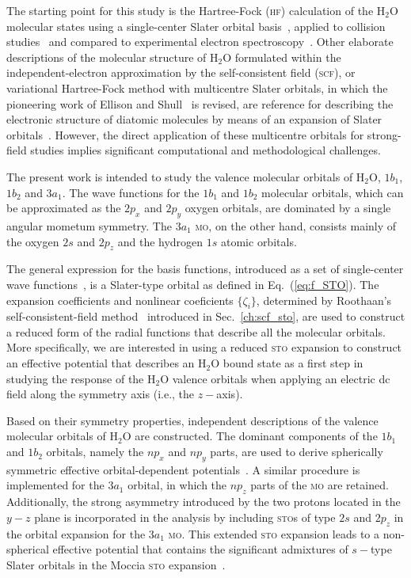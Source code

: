The starting point for this study is the Hartree-Fock (\textsc{hf})
calculation of the H$_{2}$O molecular states using a single-center
Slater orbital
basis~\cite{Moccia_1964,Moccia_JCP_2164,Moccia_JCP_2176}, applied to
collision studies~\cite{Montanari_2013} and compared to experimental
electron spectroscopy~\cite{Hafied_2007}. Other elaborate descriptions
of the molecular structure of H$_{2}$O formulated within the
independent-electron approximation by the self-consistent field
(\textsc{scf}), or variational Hartree-Fock method with multicentre
Slater orbitals, in which the pioneering work of Ellison and
Shull~\cite{EllisonShullh2o_1955} is revised, are reference for
describing the electronic structure of diatomic molecules by means of
an expansion of Slater
orbitals~\cite{Pitzer_1968,Pitzer_1970}. However, the direct
application of these multicentre orbitals for strong-field studies
implies significant computational and methodological challenges.

The present work is intended to study the valence molecular orbitals
of H$_{2}$O, $1b_{1}$, $1b_{2}$ and $3a_{1}$. The wave functions for
the $1b_{1}$ and $1b_{2}$ molecular orbitals, which can be
approximated as the $2p_{x}$ and $2p_{y}$ oxygen orbitals, are
dominated by a single angular mometum symmetry. The $3a_{1}$
\textsc{mo}, on the other hand, consists mainly of the oxygen $2s$ and
$2p_{z}$ and the hydrogen $1s$ atomic orbitals.

The general expression for the basis functions, introduced as a set of
single-center wave
functions~\cite{Moccia_1964,Moccia_JCP_2164,Moccia_JCP_2176}, is a
Slater-type orbital as defined in Eq.~(\ref{eq:f_STO}). The expansion
coefficients and nonlinear coeficients $\{\zeta_{i}\}$, determined by
Roothaan's self-consistent-field
method~\cite{Moccia_1964,Roothaan_1951} introduced in
Sec.~\ref{ch:scf_sto}, are used to construct a reduced form of the
radial functions that describe all the molecular orbitals. More
specifically, we are interested in using a reduced \textsc{sto}
expansion to construct an effective potential that describes an
H$_{2}$O bound state as a first step in studying the response of the
H$_{2}$O valence orbitals when applying an electric dc field along the
symmetry axis (i.e., the $z-$axis).

Based on their symmetry properties, independent descriptions of the
valence molecular orbitals of H$_{2}$O are constructed. The dominant
components of the $1b_{1}$ and $1b_{2}$ orbitals, namely the $np_{x}$
and $np_{y}$ parts, are used to derive spherically symmetric effective
orbital-dependent potentials~\cite{sarias_2016}. A similar procedure
is implemented for the $3a_{1}$ orbital, in which the $np_{z}$ parts
of the \textsc{mo} are retained. Additionally, the strong asymmetry
introduced by the two protons located in the $y-z$ plane is
incorporated in the analysis by including \textsc{sto}s of type $2s$
and $2p_{z}$ in the orbital expansion for the $3a_{1}$
\textsc{mo}. This extended \textsc{sto} expansion leads to a
non-spherical effective potential that contains the significant
admixtures of $s-$type Slater orbitals in the Moccia \textsc{sto}
expansion~\cite{Moccia_1964}.
 



